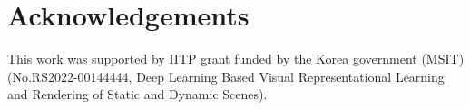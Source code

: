 \documentclass[runningheads]{llncs}
\begin{document}
\section{Acknowledgements}
This work was supported by IITP grant funded by the Korea government (MSIT) (No.RS2022-00144444, Deep Learning Based Visual Representational Learning and Rendering of Static and Dynamic Scenes).

\clearpage


%
%


\end{document}
